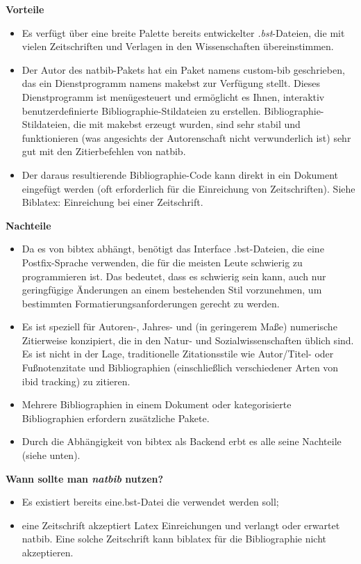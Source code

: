 \textbf{Vorteile}

\begin{itemize}
	\item Es verfügt über eine breite Palette bereits entwickelter \emph{.bst}-Dateien, die mit vielen Zeitschriften und Verlagen in den Wissenschaften übereinstimmen.
	\item Der Autor des natbib-Pakets hat ein Paket namens custom-bib geschrieben, das ein Dienstprogramm namens makebst zur Verfügung stellt. Dieses Dienstprogramm ist menügesteuert und ermöglicht es Ihnen, interaktiv benutzerdefinierte Bibliographie-Stildateien zu erstellen. Bibliographie-Stildateien, die mit makebst erzeugt wurden, sind sehr stabil und funktionieren (was angesichts der Autorenschaft nicht verwunderlich ist) sehr gut mit den Zitierbefehlen von natbib.
	\item Der daraus resultierende Bibliographie-Code kann direkt in ein Dokument eingefügt werden (oft erforderlich für die Einreichung von Zeitschriften). Siehe Biblatex: Einreichung bei einer Zeitschrift.
\end{itemize}

\textbf{Nachteile}

\begin{itemize}
	\item Da es von bibtex abhängt, benötigt das Interface .bst-Dateien, die eine Postfix-Sprache verwenden, die für die meisten Leute schwierig zu programmieren ist. Das bedeutet, dass es schwierig sein kann, auch nur geringfügige Änderungen an einem bestehenden Stil vorzunehmen, um bestimmten Formatierungsanforderungen gerecht zu werden.
	\item Es ist speziell für Autoren-, Jahres- und (in geringerem Maße) numerische Zitierweise konzipiert, die in den Natur- und Sozialwissenschaften üblich sind. Es ist nicht in der Lage, traditionelle Zitationsstile wie Autor/Titel- oder Fußnotenzitate und Bibliographien (einschließlich verschiedener Arten von ibid tracking) zu zitieren.
	\item Mehrere Bibliographien in einem Dokument oder kategorisierte Bibliographien erfordern zusätzliche Pakete.
	\item Durch die Abhängigkeit von bibtex als Backend erbt es alle seine Nachteile (siehe unten).
\end{itemize}

\textbf{Wann sollte man \emph{natbib} nutzen?}

\begin{itemize}
	\item Es existiert bereits eine.bst-Datei die verwendet werden soll;
	\item eine Zeitschrift akzeptiert Latex Einreichungen und verlangt oder erwartet natbib. Eine solche Zeitschrift kann biblatex für die Bibliographie nicht akzeptieren.
\end{itemize}

